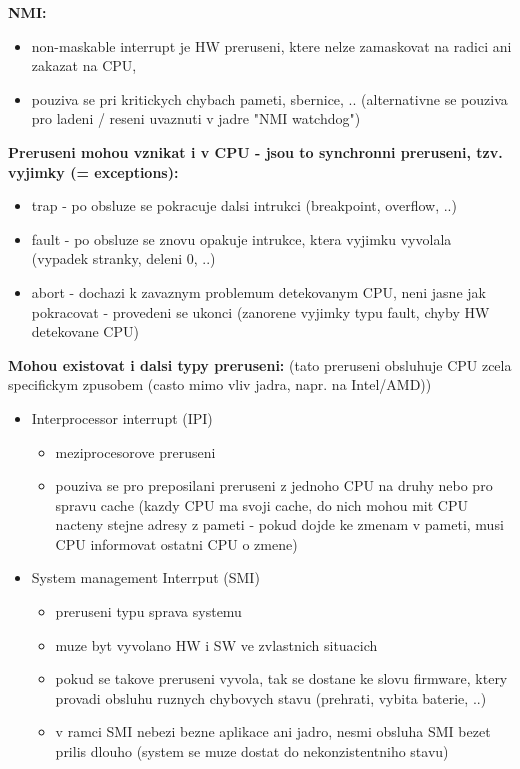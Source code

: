 \documentclass[a4paper, 11pt]{article}
\begin{document}
\noindent\textbf{NMI:}
\begin{itemize}
    \item non-maskable interrupt je HW preruseni, ktere nelze zamaskovat na radici ani zakazat na CPU,
    \item pouziva se pri kritickych chybach pameti, sbernice, .. (alternativne se pouziva pro ladeni / reseni uvaznuti v jadre "NMI watchdog") \\
\end{itemize}

\noindent\textbf{Preruseni mohou vznikat i v CPU - jsou to synchronni preruseni, tzv. vyjimky (= exceptions):}
\begin{itemize}
    \item trap - po obsluze se pokracuje dalsi intrukci (breakpoint, overflow, ..)
    \item fault - po obsluze se znovu opakuje intrukce, ktera vyjimku vyvolala (vypadek stranky, deleni 0, ..)
    \item abort - dochazi k zavaznym problemum detekovanym CPU, neni jasne jak pokracovat - provedeni se ukonci (zanorene vyjimky typu fault, chyby HW detekovane CPU) \\
\end{itemize}

\textbf{Mohou existovat i dalsi typy preruseni:} (tato preruseni obsluhuje CPU zcela specifickym zpusobem (casto mimo vliv jadra, napr. na Intel/AMD))
\begin{itemize}
    \item Interprocessor interrupt (IPI)
    \begin{itemize}
        \item meziprocesorove preruseni
        \item pouziva se pro preposilani preruseni z jednoho CPU na druhy nebo pro spravu cache (kazdy CPU ma svoji cache, do nich mohou mit CPU nacteny stejne adresy z pameti - pokud dojde ke zmenam v pameti, musi CPU informovat ostatni CPU o zmene)
    \end{itemize}
    \item System management Interrput (SMI)
    \begin{itemize}
        \item preruseni typu sprava systemu
        \item muze byt vyvolano HW i SW ve zvlastnich situacich
        \item pokud se takove preruseni vyvola, tak se dostane ke slovu firmware, ktery provadi obsluhu ruznych chybovych stavu (prehrati, vybita baterie, ..)
        \item v ramci SMI nebezi bezne aplikace ani jadro, nesmi obsluha SMI bezet prilis dlouho (system se muze dostat do nekonzistentniho stavu) \\
    \end{itemize}
\end{itemize}
\end{document}
